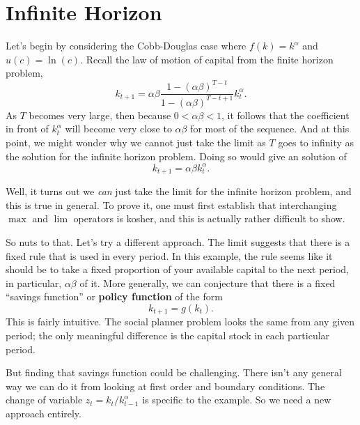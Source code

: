 \documentclass[12pt]{article}
\theoremstyle{definition}
\begin{document}
\maketitle
\onehalfspace





\section{Infinite Horizon}
Let's begin by considering the Cobb-Douglas case where $f(k)=k^{\alpha}$ and $u(c)=\ln(c)$. Recall the law of motion of capital from the finite horizon problem,
\begin{equation}
	k_{t+1} = \alpha \beta \frac{ 1 - (\alpha \beta)^{T -t}}{ 1 - (\alpha \beta)^{T -t +1}}k^{\alpha}_{t}. \label{cdlomoc} 
\end{equation}
As $T$ becomes very large, then because $0 < \alpha \beta < 1$, it follows that the coefficient in front of $k_t^{\alpha}$ will become very close to $\alpha \beta$ for most of the sequence. And at this point, we might wonder why we cannot just take the limit as $T$ goes to infinity as the solution for the infinite horizon problem. Doing so would give an solution of
	\[k_{t+1} = \alpha \beta k_t^{\alpha}.	\]

Well, it turns out we \emph{can} just take the limit for the infinite horizon problem, and this is true in general. To prove it, one must first establish that  interchanging $\max$ and $\lim$ operators  is kosher, and this is actually rather difficult to show. 

So nuts to that. Let's try a different approach. The limit suggests that there is a fixed rule that is used in every period. In this example, the rule seems like it should be to take a fixed proportion of your available capital to the next period, in particular, $\alpha \beta$ of it. More generally, we can conjecture that there is a fixed ``savings function'' or \textbf{policy function} of the form
	\[	k_{t+1} = g(k_t).	\]
This is fairly intuitive. The social planner problem looks the same from any given period; the only meaningful difference is the capital stock in each particular period. 

But finding that savings function could be challenging. There isn't any general way we can do it from looking at first order and boundary conditions. The change of variable $z_t = k_t / k_{t-1}^{\alpha}$ is specific to the example. So we need a new approach entirely. 
\end{document}
